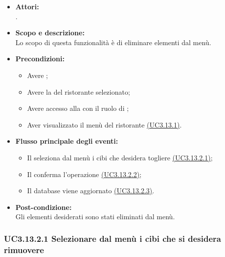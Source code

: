 \begin{itemize}
	\item \textbf{Attori:}
	\\.
	\item \textbf{Scopo e descrizione:} 
	\\Lo scopo di questa funzionalità è di eliminare elementi dal menù.
	\item \textbf{Precondizioni:}
	\begin{itemize}
		\item Avere ;
		\item Avere la  del ristorante selezionato;
		\item Avere accesso alla  con il ruolo di ;
		\item Aver visualizzato il menù del ristorante \hyperref[UC3.13.1]{(UC3.13.1)}.
	\end{itemize}
	\item \textbf{Flusso principale degli eventi:}
	\begin{itemize}
		\item Il  seleziona dal menù i cibi che desidera togliere \hyperref[UC3.13.2.1]{(UC3.13.2.1)};
		\item Il  conferma l'operazione \hyperref[UC3.13.2.2]{(UC3.13.2.2)};
		\item Il database viene aggiornato \hyperref[UC3.13.2.3]{(UC3.13.2.3)}.
	\end{itemize}
	\item \textbf{Post-condizione:}
	\\Gli elementi desiderati sono stati eliminati dal menù.
\end{itemize}

\subsubsection{UC3.13.2.1 Selezionare dal menù i cibi che si desidera rimuovere} \label{UC3.13.2.1}


